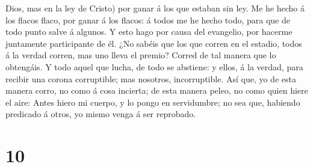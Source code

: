 Dios, mas en la ley de Cristo) por ganar á los que estaban sin ley.
 Me he hecho á los flacos flaco, por ganar á los flacos: á
todos me he hecho todo, para que de todo punto salve á algunos.
 Y esto hago por causa del evangelio, por hacerme
juntamente participante de él.  ¿No sabéis que los que
corren en el estadio, todos á la verdad corren, mas uno lleva el premio?
Corred de tal manera que lo obtengáis.  Y todo aquel que
lucha, de todo se abstiene: y ellos, á la verdad, para recibir una
corona corruptible; mas nosotros, incorruptible.  Así que,
yo de esta manera corro, no como á cosa incierta; de esta manera peleo,
no como quien hiere el aire:  Antes hiero mi cuerpo, y lo
pongo en servidumbre; no sea que, habiendo predicado á otros, yo mismo
venga á ser reprobado.

\hypertarget{section-9}{%
\section{10}\label{section-9}}

